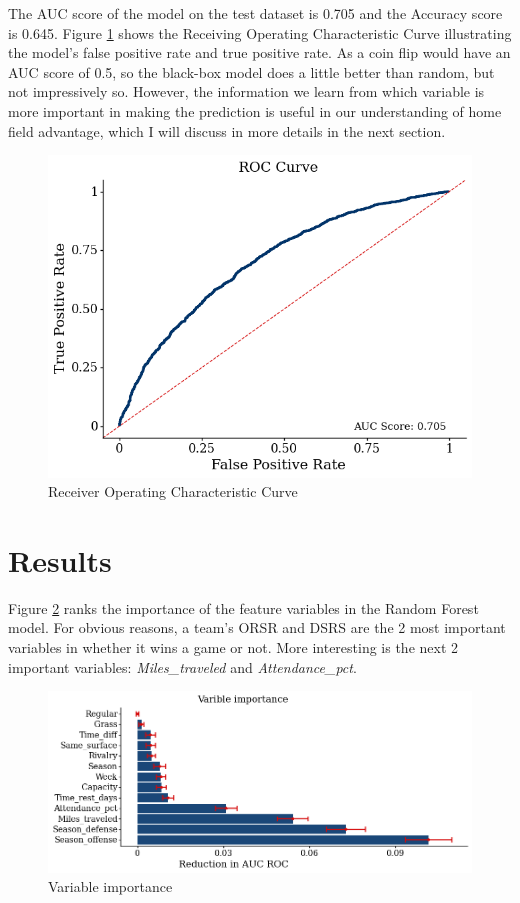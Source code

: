 \documentclass[12pt, letterpaper, twoside]{article}
\begin{document}
The AUC score of the model on the test dataset is 0.705 and the Accuracy score is 0.645. Figure \ref{fig:roc} shows the Receiving Operating Characteristic Curve illustrating the model's false positive rate and true positive rate. As a coin flip would have an AUC score of 0.5, so the black-box model does a little better than random, but not impressively so. However, the information we learn from which variable is more important in making the prediction is useful in our understanding of home field advantage, which I will discuss in more details in the next section. 

\begin{figure}[H]%
	\centering
   \includegraphics[width=0.5\linewidth]{../09_figures/plot_roc.png} 
    \caption{Receiver Operating Characteristic Curve}
    \label{fig:roc}%
\end{figure}

\section{Results}

Figure \ref{fig:vi} ranks the importance of the feature variables in the Random Forest model. For obvious reasons, a team's ORSR and DSRS are the 2 most important variables in whether it wins a game or not. More interesting is the next 2 important variables: \textit{Miles\_traveled} and \textit{Attendance\_pct}.

\begin{figure}[H]%
	\centering
   \includegraphics[width=0.8\linewidth]{../09_figures/plot_vi.png} 
    \caption{Variable importance}
    \label{fig:vi}%
\end{figure}
\end{document}
